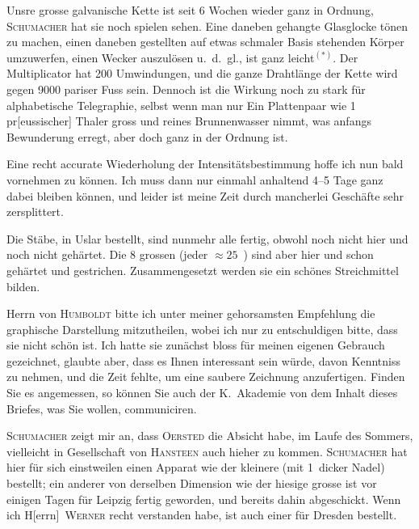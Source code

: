 \documentclass[12pt,a4paper]{article}
\begin{document}
Unsre grosse galvanische Kette ist seit 6 Wochen wieder ganz in Ordnung, \textsc{Schumacher} hat sie noch spielen sehen. Eine daneben gehangte Glasglocke t\"onen zu machen, einen daneben gestellten auf etwas schmaler Basis stehenden K\"orper umzuwerfen, einen Wecker auszul\"osen u.~d.~gl., ist ganz leicht$^{(*)}$. Der Multiplicator hat 200 Umwindungen, und die ganze Drahtl\"ange der Kette wird gegen 9000 pariser Fuss sein. Dennoch ist die Wirkung noch zu stark f\"ur alphabetische Telegraphie, selbst wenn man nur Ein Plattenpaar wie 1 pr[eussischer] Thaler gross und reines Brunnenwasser nimmt, was anfangs Bewunderung erregt, aber doch ganz in der Ordnung ist.

Eine recht accurate Wiederholung der Intensit\"atsbestimmung hoffe ich nun bald vornehmen zu k\"onnen. Ich muss dann nur einmahl anhaltend 4--5 Tage ganz dabei bleiben k\"onnen, und leider ist meine Zeit durch mancherlei Gesch\"afte sehr zersplittert.

Die St\"abe, in Uslar bestellt, sind nunmehr alle fertig, obwohl noch nicht hier und noch nicht geh\"artet. Die 8 grossen (jeder $\approx 25$~\textPi) sind aber hier und schon geh\"artet und gestrichen. Zusammengesetzt werden sie ein sch\"ones Streichmittel bilden.

Herrn von \textsc{Humboldt} bitte ich unter meiner gehorsamsten Empfehlung die graphische Darstellung mitzutheilen, wobei ich nur zu entschuldigen bitte, dass sie nicht sch\"on ist. Ich hatte sie zun\"achst bloss f\"ur meinen eigenen Gebrauch gezeichnet, glaubte aber, dass es Ihnen interessant sein w\"urde, davon Kenntniss zu nehmen, und die Zeit fehlte, um eine saubere Zeichnung anzufertigen. Finden Sie es angemessen, so k\"onnen Sie auch der K.~Akademie von dem Inhalt dieses Briefes, was Sie wollen, communiciren.

\textsc{Schumacher} zeigt mir an, dass \textsc{Oersted} die Absicht habe, im Laufe des Sommers, vielleicht in Gesellschaft von \textsc{Hansteen} auch hieher zu kommen. \textsc{Schumacher} hat hier f\"ur sich einstweilen einen Apparat wie der kleinere (mit 1~\textPi dicker Nadel) bestellt; ein anderer von derselben Dimension wie der hiesige grosse ist vor einigen Tagen f\"ur Leipzig fertig geworden, und bereits dahin abgeschickt. Wenn ich H[errn]~\textsc{Werner} recht verstanden habe, ist auch einer f\"ur Dresden bestellt.
\end{document}
